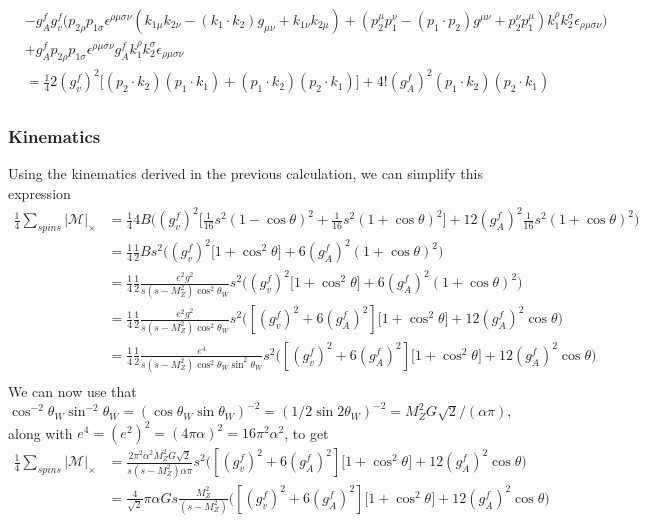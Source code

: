 \documentclass[11pt]{article}
\begin{document}
\begin{flushleft}
\begin{align*}
&- g_A^f g_v^f \Big( p_{2 \rho} p_{1 \sigma}\epsilon^{\rho \mu \sigma \nu}
(k_{1 \mu} k_{2 \nu} - (k_1 \cdot k_2)g_{\mu \nu} + k_{1 \nu} k_{2 \mu}) +(p_2^{\mu} p_1^{\nu} - (p_1 \cdot p_2)g^{\mu \nu} + p_2^{\nu} p_1^{\mu})
k_1^{\rho} k_2^{\sigma} \epsilon_{\rho \mu \sigma \nu} \Big) \\
&+ g_A^f p_{2 \rho} p_{1 \sigma}\epsilon^{\rho \mu \sigma \nu}g_A^f k_1^{\rho} k_2^{\sigma} \epsilon_{\rho \mu \sigma \nu} \\
&= \frac{1}{4} 2 (g_v^f)^2\Big[(p_2 \cdot k_2) (p_1 \cdot k_1)  + (p_1 \cdot k_2) (p_2 \cdot k_1) \Big] 
+ 4! (g_A^f)^2 (p_1 \cdot k_2)(p_2 \cdot k_1) \\
\end{align*}
\end{flushleft}

\pagebreak

\subsubsection*{Kinematics}
\begin{flushleft}
Using the kinematics derived in the previous calculation, we can simplify this expression
\begin{align*}
\frac{1}{4} \sum_{spins} |\mathcal{M}|_{\times} &= \frac{1}{4} 4 B \Big((g_v^f)^2\Big[\frac{1}{16}s^2(1- \cos \theta)^2  + \frac{1}{16}s^2(1+ \cos \theta)^2 \Big] 
+ 12 (g_A^f)^2 \frac{1}{16}s^2(1+ \cos \theta)^2 \Big)\\
&= \frac{1}{4} \frac{1}{2} B s^2 \Big((g_v^f)^2 \Big[1+ \cos^2 \theta\Big] 
+ 6 (g_A^f)^2 (1+ \cos \theta)^2 \Big)\\
&= \frac{1}{4} \frac{1}{2} \frac{e^2 g^2}{s(s - M_Z^2)\cos^2 \theta_W} s^2 \Big((g_v^f)^2 \Big[1+ \cos^2 \theta\Big] 
+ 6 (g_A^f)^2 (1+ \cos \theta)^2 \Big)\\
&= \frac{1}{4} \frac{1}{2} \frac{e^2 g^2}{s(s - M_Z^2)\cos^2 \theta_W} s^2 
\Big([(g_v^f)^2 + 6 (g_A^f)^2] \Big[1+ \cos^2 \theta\Big] 
+ 12 (g_A^f)^2 \cos \theta \Big)\\
&= \frac{1}{4} \frac{1}{2} \frac{e^4}{s(s - M_Z^2)\cos^2 \theta_W \sin^2 \theta_W} s^2 
\Big([(g_v^f)^2 + 6 (g_A^f)^2] \Big[1+ \cos^2 \theta\Big] 
+ 12 (g_A^f)^2 \cos \theta \Big)\\
\end{align*}
We can now use that $\cos^{-2} \theta_W \sin^{-2} \theta_W = (\cos \theta_W \sin \theta_W)^{-2} = (1/2 \sin 2 \theta_W)^{-2} =M_Z^2G \sqrt{2}/(\alpha \pi)$, along with $e^4 = (e^2)^2 = (4 \pi \alpha)^2 = 16 \pi^2 \alpha^2$, to get
\begin{align*}
\frac{1}{4} \sum_{spins} |\mathcal{M}|_{\times} &=   \frac{2 \pi^2 \alpha^2 M_Z^2 G \sqrt{2}}{s(s - M_Z^2)\alpha \pi} s^2 
\Big([(g_v^f)^2 + 6 (g_A^f)^2] \Big[1+ \cos^2 \theta\Big] 
+ 12 (g_A^f)^2 \cos \theta \Big)\\
&= \frac{4}{\sqrt{2}} \pi \alpha G s \frac{M_Z^2 }{(s - M_Z^2)} 
\Big([(g_v^f)^2 + 6 (g_A^f)^2] \Big[1+ \cos^2 \theta\Big] 
+ 12 (g_A^f)^2 \cos \theta \Big)\\
\end{align*}
\end{flushleft}
\end{document}
